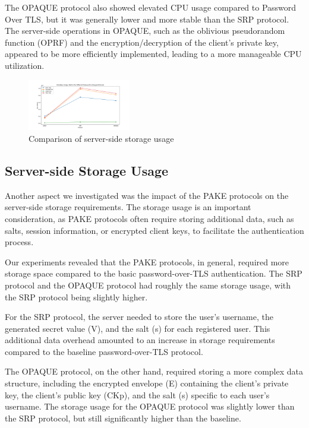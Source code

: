 The OPAQUE protocol also showed elevated CPU usage compared to Password Over TLS, but it was generally lower and more stable than the SRP protocol. The server-side operations in OPAQUE, such as the oblivious pseudorandom function (OPRF) and the encryption/decryption of the client's private key, appeared to be more efficiently implemented, leading to a more manageable CPU utilization.

\begin{figure}[ht]
  \centering
  \includegraphics[width=0.4\textwidth]{./images/database_usage_metrics_line.png}
  \caption{Comparison of server-side storage usage}
  \label{fig:storage_usage}
\end{figure}

\subsection{Server-side Storage Usage}

Another aspect we investigated was the impact of the PAKE protocols on the server-side storage requirements. The storage usage is an important consideration, as PAKE protocols often require storing additional data, such as salts, session information, or encrypted client keys, to facilitate the authentication process.

Our experiments revealed that the PAKE protocols, in general, required more storage space compared to the basic password-over-TLS authentication. The SRP protocol and the OPAQUE protocol had roughly the same storage usage, with the SRP protocol being slightly higher.

For the SRP protocol, the server needed to store the user's username, the generated secret value (V), and the salt (s) for each registered user. This additional data overhead amounted to an increase in storage requirements compared to the baseline password-over-TLS protocol.

The OPAQUE protocol, on the other hand, required storing a more complex data structure, including the encrypted envelope (E) containing the client's private key, the client's public key (CKp), and the salt (s) specific to each user's username. The storage usage for the OPAQUE protocol was slightly lower than the SRP protocol, but still significantly higher than the baseline.

